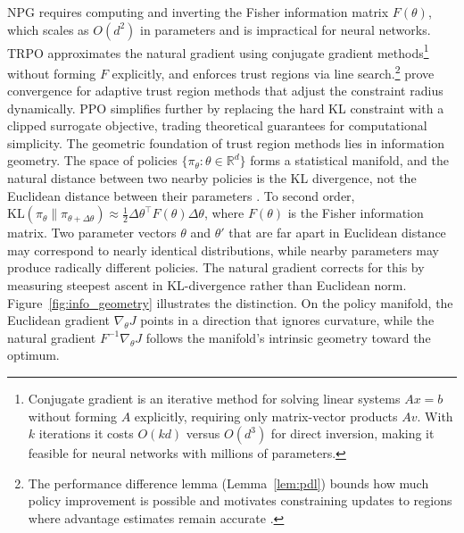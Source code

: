 NPG requires computing and inverting the Fisher information matrix $F(\theta)$, which scales as $O(d^2)$ in parameters and is impractical for neural networks. TRPO \citep{Schulman2015} approximates the natural gradient using conjugate gradient methods\footnote{Conjugate gradient is an iterative method for solving linear systems $Ax = b$ without forming $A$ explicitly, requiring only matrix-vector products $Av$. With $k$ iterations it costs $O(kd)$ versus $O(d^3)$ for direct inversion, making it feasible for neural networks with millions of parameters.} without forming $F$ explicitly, and enforces trust regions via line search.\footnote{The performance difference lemma (Lemma~\ref{lem:pdl}) bounds how much policy improvement is possible and motivates constraining updates to regions where advantage estimates remain accurate \citep{Kakade2002}.} \citet{shani2020} prove convergence for adaptive trust region methods that adjust the constraint radius dynamically. PPO \citep{Schulman2017} simplifies further by replacing the hard KL constraint with a clipped surrogate objective, trading theoretical guarantees for computational simplicity.
The geometric foundation of trust region methods lies in information geometry. The space of policies $\{\pi_\theta : \theta \in \mathbb{R}^d\}$ forms a statistical manifold, and the natural distance between two nearby policies is the KL divergence, not the Euclidean distance between their parameters \citep{amari1998natural}. To second order, $\mathrm{KL}(\pi_\theta \| \pi_{\theta + \Delta\theta}) \approx \frac{1}{2} \Delta\theta^\top F(\theta) \Delta\theta$, where $F(\theta)$ is the Fisher information matrix. Two parameter vectors $\theta$ and $\theta'$ that are far apart in Euclidean distance may correspond to nearly identical distributions, while nearby parameters may produce radically different policies. The natural gradient corrects for this by measuring steepest ascent in KL-divergence rather than Euclidean norm. Figure~\ref{fig:info_geometry} illustrates the distinction. On the policy manifold, the Euclidean gradient $\nabla_\theta J$ points in a direction that ignores curvature, while the natural gradient $F^{-1} \nabla_\theta J$ follows the manifold's intrinsic geometry toward the optimum.

